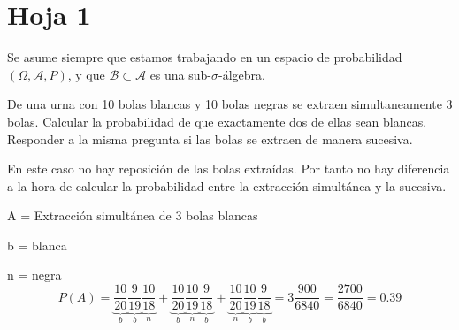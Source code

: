 %
%
%

\section{Hoja 1}

Se asume siempre que estamos trabajando en un espacio de probabilidad $(\Omega, \mathcal{A}, P)$, y que  $\mathcal{B}\subset \mathcal{A}$ es una sub-$\sigma$-\'algebra.

\begin{problem}[1]De una urna con 10 bolas blancas y 10 bolas negras se extraen simultaneamente 3 bolas. 
Calcular la probabilidad de que exactamente dos de ellas sean blancas. Responder a la misma
pregunta si las bolas se extraen de manera sucesiva.
\solution

\begin{expla}
En este caso no hay reposición de las bolas extraídas. Por tanto no hay diferencia a la hora de calcular la probabilidad entre la extracción simultánea y la sucesiva.
\end{expla}
A = Extracción simultánea de 3 bolas blancas

b = blanca

n = negra
\[
P(A)=\underbrace{\frac{10}{20}}_{b}\underbrace{\frac{9}{19}}_{b}\underbrace{\frac{10}{18}}_{n}+\underbrace{\frac{10}{20}}_{b}\underbrace{\frac{10}{19}}_{n}\underbrace{\frac{9}{18}}_{b}+\underbrace{\frac{10}{20}}_{n}\underbrace{\frac{10}{19}}_{b}\underbrace{\frac{9}{18}}_{b} = 3\frac{900}{6840}=\frac{2700}{6840}=0.39
\]

\end{problem}



